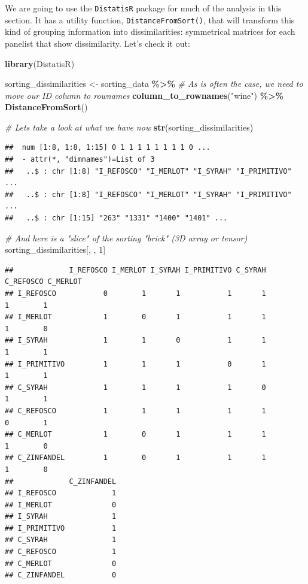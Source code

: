 \documentclass[
]{book}
\newenvironment{Shaded}{\begin{snugshade}}{\end{snugshade}}
\newcommand{\CommentTok}[1]{\textcolor[rgb]{0.56,0.35,0.01}{\textit{#1}}}
\newcommand{\DecValTok}[1]{\textcolor[rgb]{0.00,0.00,0.81}{#1}}
\newcommand{\FunctionTok}[1]{\textcolor[rgb]{0.13,0.29,0.53}{\textbf{#1}}}
\newcommand{\NormalTok}[1]{#1}
\newcommand{\OtherTok}[1]{\textcolor[rgb]{0.56,0.35,0.01}{#1}}
\newcommand{\SpecialCharTok}[1]{\textcolor[rgb]{0.81,0.36,0.00}{\textbf{#1}}}
\newcommand{\StringTok}[1]{\textcolor[rgb]{0.31,0.60,0.02}{#1}}
\begin{document}
We are going to use the \texttt{DistatisR} package for much of the analysis in this section. It has a utility function, \texttt{DistanceFromSort()}, that will transform this kind of grouping information into dissimilarities: symmetrical matrices for each panelist that show dissimilarity. Let's check it out:

\begin{Shaded}
\begin{Highlighting}[]
\FunctionTok{library}\NormalTok{(DistatisR)}

\NormalTok{sorting\_dissimilarities }\OtherTok{\textless{}{-}} 
\NormalTok{  sorting\_data }\SpecialCharTok{\%\textgreater{}\%}
  \CommentTok{\# As is often the case, we need to move our ID column to \textasciigrave{}rownames\textasciigrave{}}
  \FunctionTok{column\_to\_rownames}\NormalTok{(}\StringTok{"wine"}\NormalTok{) }\SpecialCharTok{\%\textgreater{}\%}
  \FunctionTok{DistanceFromSort}\NormalTok{()}

\CommentTok{\# Let\textquotesingle{}s take a look at what we have now}
\FunctionTok{str}\NormalTok{(sorting\_dissimilarities)}
\end{Highlighting}
\end{Shaded}

\begin{verbatim}
##  num [1:8, 1:8, 1:15] 0 1 1 1 1 1 1 1 1 0 ...
##  - attr(*, "dimnames")=List of 3
##   ..$ : chr [1:8] "I_REFOSCO" "I_MERLOT" "I_SYRAH" "I_PRIMITIVO" ...
##   ..$ : chr [1:8] "I_REFOSCO" "I_MERLOT" "I_SYRAH" "I_PRIMITIVO" ...
##   ..$ : chr [1:15] "263" "1331" "1400" "1401" ...
\end{verbatim}

\begin{Shaded}
\begin{Highlighting}[]
\CommentTok{\# And here is a "slice" of the sorting "brick" (3D array or tensor)}
\NormalTok{sorting\_dissimilarities[, , }\DecValTok{1}\NormalTok{]}
\end{Highlighting}
\end{Shaded}

\begin{verbatim}
##             I_REFOSCO I_MERLOT I_SYRAH I_PRIMITIVO C_SYRAH C_REFOSCO C_MERLOT
## I_REFOSCO           0        1       1           1       1         1        1
## I_MERLOT            1        0       1           1       1         1        0
## I_SYRAH             1        1       0           1       1         1        1
## I_PRIMITIVO         1        1       1           0       1         1        1
## C_SYRAH             1        1       1           1       0         1        1
## C_REFOSCO           1        1       1           1       1         0        1
## C_MERLOT            1        0       1           1       1         1        0
## C_ZINFANDEL         1        0       1           1       1         1        0
##             C_ZINFANDEL
## I_REFOSCO             1
## I_MERLOT              0
## I_SYRAH               1
## I_PRIMITIVO           1
## C_SYRAH               1
## C_REFOSCO             1
## C_MERLOT              0
## C_ZINFANDEL           0
\end{verbatim}
\end{document}
